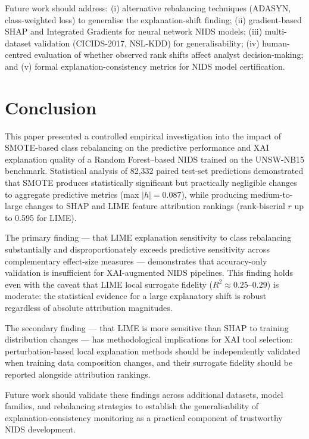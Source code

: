 \documentclass[conference,a4paper]{IEEEtran}
\newcommand{\NIDS}{NIDS\xspace}
\newcommand{\SMOTE}{SMOTE\xspace}
\newcommand{\XAI}{XAI\xspace}
\begin{document}
Future work should address: (i) alternative rebalancing techniques (ADASYN,
class-weighted loss) to generalise the explanation-shift finding; (ii)
gradient-based SHAP and Integrated Gradients for neural network \NIDS models;
(iii) multi-dataset validation (CICIDS-2017, NSL-KDD) for generalisability;
(iv) human-centred evaluation of whether observed rank shifts affect analyst
decision-making; and (v) formal explanation-consistency metrics for \NIDS
model certification.

\section{Conclusion}
\label{sec:conclusion}

This paper presented a controlled empirical investigation into the impact of
\SMOTE-based class rebalancing on the predictive performance and \XAI explanation
quality of a Random Forest--based \NIDS trained on the UNSW-NB15 benchmark.
Statistical analysis of 82,332 paired test-set predictions demonstrated that
\SMOTE produces statistically significant but practically negligible changes to
aggregate predictive metrics (max $|h|=0.087$), while producing medium-to-large
changes to SHAP and LIME feature attribution rankings (rank-biserial $r$ up to
0.595 for LIME).

The primary finding --- that LIME explanation sensitivity to class rebalancing
substantially and disproportionately exceeds predictive sensitivity across
complementary effect-size measures --- demonstrates that accuracy-only validation
is insufficient for \XAI-augmented \NIDS pipelines. This finding holds even with
the caveat that LIME local surrogate fidelity ($R^2\approx0.25$--$0.29$) is
moderate: the statistical evidence for a large explanatory shift is robust
regardless of absolute attribution magnitudes.

The secondary finding --- that LIME is more sensitive than SHAP to training
distribution changes --- has methodological implications for \XAI tool selection:
perturbation-based local explanation methods should be independently validated when
training data composition changes, and their surrogate fidelity should be reported
alongside attribution rankings.

Future work should validate these findings across additional datasets, model
families, and rebalancing strategies to establish the generalisability of
explanation-consistency monitoring as a practical component of trustworthy \NIDS
development.
\end{document}
